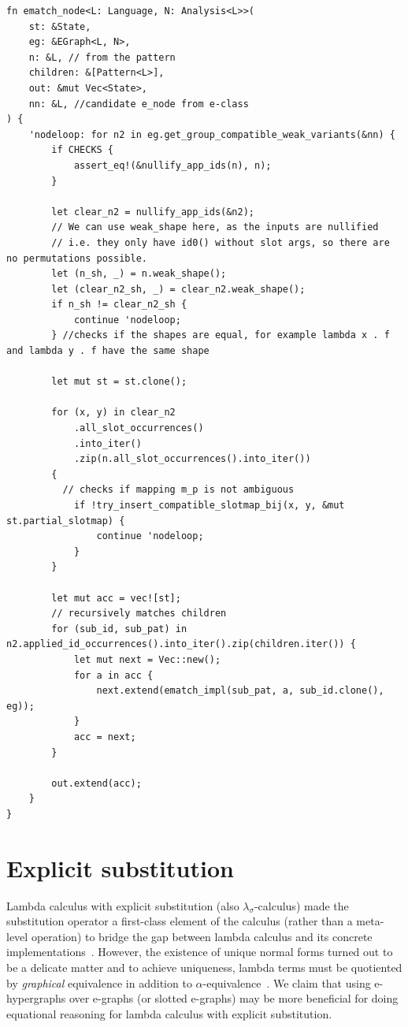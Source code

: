 \documentclass[acmsmall,screen, nonacm, anonymous]{acmart}
\begin{document}
\begin{listing}
\begin{verbatim}
fn ematch_node<L: Language, N: Analysis<L>>(
    st: &State,
    eg: &EGraph<L, N>,
    n: &L, // from the pattern
    children: &[Pattern<L>],
    out: &mut Vec<State>,
    nn: &L, //candidate e_node from e-class
) {
    'nodeloop: for n2 in eg.get_group_compatible_weak_variants(&nn) {
        if CHECKS {
            assert_eq!(&nullify_app_ids(n), n);
        }

        let clear_n2 = nullify_app_ids(&n2);
        // We can use weak_shape here, as the inputs are nullified
        // i.e. they only have id0() without slot args, so there are no permutations possible.
        let (n_sh, _) = n.weak_shape();
        let (clear_n2_sh, _) = clear_n2.weak_shape();
        if n_sh != clear_n2_sh {
            continue 'nodeloop;
        } //checks if the shapes are equal, for example lambda x . f and lambda y . f have the same shape

        let mut st = st.clone();

        for (x, y) in clear_n2
            .all_slot_occurrences()
            .into_iter()
            .zip(n.all_slot_occurrences().into_iter())
        {
          // checks if mapping m_p is not ambiguous
            if !try_insert_compatible_slotmap_bij(x, y, &mut st.partial_slotmap) {
                continue 'nodeloop;
            }
        }

        let mut acc = vec![st];
        // recursively matches children
        for (sub_id, sub_pat) in n2.applied_id_occurrences().into_iter().zip(children.iter()) {
            let mut next = Vec::new();
            for a in acc {
                next.extend(ematch_impl(sub_pat, a, sub_id.clone(), eg));
            }
            acc = next;
        }

        out.extend(acc);
    }
}

\end{verbatim}
\end{listing}

\section{Explicit substitution}

Lambda calculus with explicit substitution (also $\lambda_{\sigma}$-calculus) made the substitution operator a first-class element of the calculus (rather than a meta-level operation) to bridge the gap between lambda calculus and its concrete implementations~\cite{Abadi_Cardelli_Curien_Lévy_1991}.
However, the existence of unique normal forms turned out to be a delicate matter and to achieve uniqueness, lambda terms must be quotiented by \textit{graphical} equivalence in addition to $\alpha$-equivalence~\cite{Standardisation}.
We claim that using e-hypergraphs over e-graphs (or slotted e-graphs) may be more beneficial for doing equational reasoning for lambda calculus with explicit substitution.
\end{document}
